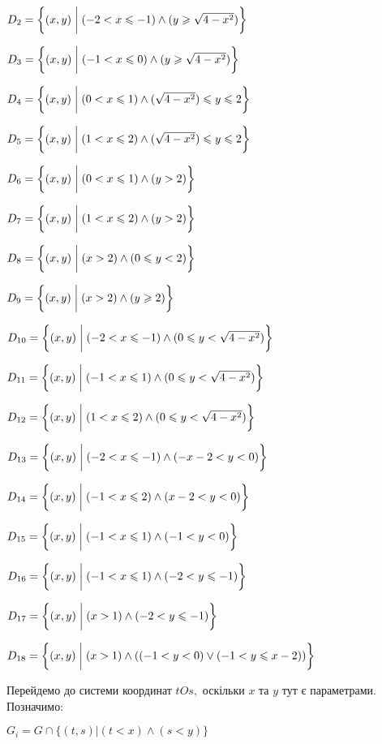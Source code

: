 \documentclass[a4paper, 20pt, titlepage]{article}
\begin{document}
\begin{spacing}{1.4}
$D_2 = \biggl\{ (x,y) \biggm| (-2  < x  \leqslant -1 )\wedge(y \geqslant \sqrt{4-x^2}) \biggr\}$

$D_3 = \biggl\{ (x,y) \biggm| (-1 < x \leqslant 0) \wedge (y \geqslant \sqrt{4-x^2})  \biggr\}$

$D_4 = \biggl\{ (x,y) \biggm| (0 < x \leqslant 1) \wedge (\sqrt{4-x^2})  \leqslant y \leqslant  2 \biggr\}$

$D_5 = \biggl\{ (x,y) \biggm| (1 < x \leqslant 2) \wedge (\sqrt{4-x^2})  \leqslant y \leqslant  2  \biggr\}$

$D_6 = \biggl\{ (x,y) \biggm|  (0 < x \leqslant 1) \wedge (y > 2)\biggr\}$

$D_7 = \biggl\{ (x,y) \biggm| (1 < x \leqslant 2) \wedge (y > 2) \biggr\}$

$D_8 = \biggl\{ (x,y) \biggm|(x > 2)\wedge(0 \leqslant y < 2)  \biggr\}$

$D_9 = \biggl\{ (x,y) \biggm| (x > 2)\wedge(y \geqslant 2)\biggr\}$

$D_{10} = \biggl\{ (x,y) \biggm| ( -2 < x \leqslant -1)\wedge(0 \leqslant y < \sqrt{4-x^2})  \biggr\}$

$D_{11} = \biggl\{ (x,y) \biggm|  (-1 <  x \leqslant 1)\wedge(0 \leqslant y < \sqrt{4-x^2})  \biggr\}$

$D_{12} = \biggl\{ (x,y) \biggm| (1 <  x \leqslant 2) \wedge (0 \leqslant y < \sqrt{4-x^2})  \biggr\}$

$D_{13} = \biggl\{ (x,y) \biggm|  (-2 < x \leqslant -1) \wedge (-x-2 < y < 0)  \biggr\}$

$D_{14} = \biggl\{ (x,y) \biggm| (-1 < x \leqslant 2) \wedge (x-2 < y < 0)   \biggr\}$

$D_{15} = \biggl\{ (x,y) \biggm| (-1 < x \leqslant 1) \wedge (-1 < y < 0) \biggr\}$

$D_{16} = \biggl\{ (x,y) \biggm| (-1 < x \leqslant 1) \wedge (-2 < y \leqslant -1) \biggr\}$

$D_{17} = \biggl\{ (x,y) \biggm| (x > 1) \wedge ( -2 < y \leqslant -1) \biggr\}$

$D_{18} = \biggl\{ (x,y) \biggm| (x > 1) \wedge ((-1 < y < 0)\vee(-1 < y \leqslant x-2 )) \biggr\}$

\vspace{5mm}
Перейдемо до системи координат $tOs,$ оскільки $x$ та $y$ тут є параметрами. Позначимо:

\begin{center}
$G_i = G \cap \{(t,s)| (t < x)\wedge(s < y) \}$
\end{center}


\end{spacing}
\end{document}
